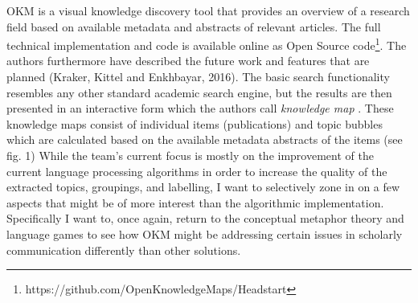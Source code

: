 OKM is a visual knowledge discovery tool that provides an overview of a research field based on available metadata and abstracts of relevant articles. The full technical implementation and code is available online as Open Source code\footnote{https://github.com/OpenKnowledgeMaps/Headstart}. The authors furthermore have described the future work and features that are planned (Kraker, Kittel and Enkhbayar, 2016). The basic search functionality resembles any other standard academic search engine, but the results are then presented in an interactive form which the authors call \textit{knowledge map} . These knowledge maps consist of individual items
(publications) and topic bubbles which are calculated based on the available metadata abstracts of the items (see fig. 1) While the team’s current focus is mostly on the improvement of the current language processing algorithms in order to increase the quality of the extracted topics, groupings, and labelling, I want to selectively zone in on a few aspects that might be of more interest than the algorithmic implementation. Specifically I want to, once again, return to the
conceptual metaphor theory and language games to see how OKM might be addressing certain issues in scholarly communication differently than other solutions.